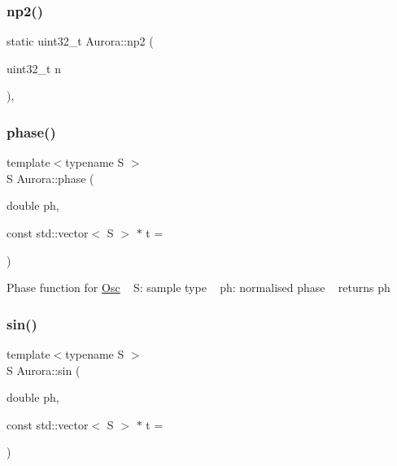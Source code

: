 \subsubsection{\texorpdfstring{np2()}{np2()}}
{\footnotesize\ttfamily static uint32\+\_\+t Aurora\+::np2 (\begin{DoxyParamCaption}\item[{uint32\+\_\+t}]{n }\end{DoxyParamCaption})\hspace{0.3cm}{\ttfamily [inline]}, {\ttfamily [static]}}

\mbox{\label{namespace_aurora_a6a6af5d9695d0ec8fcb343c456c1faab}} 
\subsubsection{\texorpdfstring{phase()}{phase()}}
{\footnotesize\ttfamily template$<$typename S $>$ \\
S Aurora\+::phase (\begin{DoxyParamCaption}\item[{double}]{ph,  }\item[{const std\+::vector$<$ S $>$ $\ast$}]{t = {} }\end{DoxyParamCaption})\hspace{0.3cm}{\ttfamily [inline]}}

Phase function for \hyperlink{class_aurora_1_1_osc}{Osc} ~\newline
S\+: sample type ~\newline
ph\+: normalised phase ~\newline
returns ph \mbox{\label{namespace_aurora_a76909b8c5d5801213d35fffa69499885}} 
\subsubsection{\texorpdfstring{sin()}{sin()}}
{\footnotesize\ttfamily template$<$typename S $>$ \\
S Aurora\+::sin (\begin{DoxyParamCaption}\item[{double}]{ph,  }\item[{const std\+::vector$<$ S $>$ $\ast$}]{t = {} }\end{DoxyParamCaption})\hspace{0.3cm}{\ttfamily [inline]}}


